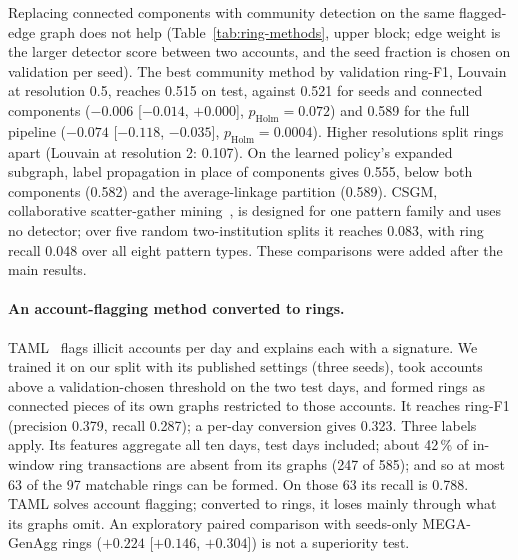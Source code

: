 Replacing connected components with community detection on the same flagged-edge graph does
not help (Table~\ref{tab:ring-methods}, upper block; edge weight is the larger detector score
between two accounts, and the seed fraction is chosen on validation per seed). The best
community method by validation ring-F1, Louvain at resolution 0.5, reaches 0.515 on test,
against 0.521 for seeds and connected components ($-0.006$ [$-0.014$, $+0.000$],
$p_{\mathrm{Holm}}=0.072$) and 0.589 for the full pipeline ($-0.074$ [$-0.118$, $-0.035$],
$p_{\mathrm{Holm}}=0.0004$). Higher resolutions split rings apart (Louvain at resolution 2:
0.107). On the learned policy's expanded subgraph, label propagation in place of components
gives 0.555, below both components (0.582) and the average-linkage partition (0.589). CSGM,
collaborative scatter-gather mining~\citep{tian2025}, is designed for one pattern family and
uses no detector; over five random two-institution splits it reaches 0.083, with ring recall
0.048 over all eight pattern types. These comparisons were added after the main results.

\paragraph{An account-flagging method converted to rings.}
TAML~\citep{rico2026} flags illicit accounts per day and explains each with a signature. We trained it
on our split with its published settings (three seeds), took accounts above a validation-chosen
threshold on the two test days, and formed rings as connected pieces of its own graphs restricted
to those accounts. It reaches ring-F1  (precision 0.379, recall 0.287); a
per-day conversion gives 0.323. Three labels apply. Its features aggregate all ten days, test days
included; about 42\,\% of in-window ring transactions are absent from its graphs (247 of 585); and
so at most 63 of the 97 matchable rings can be formed. On those 63 its recall is 0.788. TAML solves
account flagging; converted to rings, it loses mainly through what its graphs omit. An exploratory
paired comparison with seeds-only MEGA-GenAgg rings ($+0.224$ [$+0.146$, $+0.304$]) is not a
superiority test.

